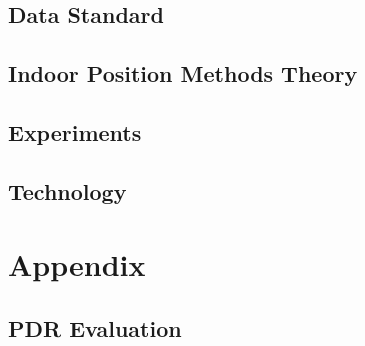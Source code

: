 \cleardoublepage
{}
\pagestyle{fancy} %

\setcounter{tocdepth}{1}
\tableofcontents

\newpage{}


\chapter{Data Standard}


\chapter{Indoor Position Methods Theory}







\chapter{Experiments}



\chapter{Technology}



\newpage
\listoftodos
\newpage

\renewcommand{\glsgroupskip}{}
\printglossaries


\printbibliography

\part{Appendix}
\appendix
\chapter{PDR Evaluation}\label{PDR:results}




